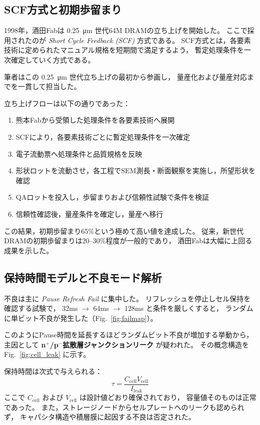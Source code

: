\documentclass[conference]{IEEEtran}
\let\meter\metre
\begin{document}
\subsection{SCF方式と初期歩留まり}
1998年，酒田Fabは \SI{0.25}{\micro\meter} 世代64M DRAMの立ち上げを開始した。
ここで採用されたのが \emph{Short Cycle Feedback (SCF)} 方式である。
SCF方式とは，各要素技術に定められたマニュアル規格を短期間で満足するよう，
暫定処理条件を一次確定していく方式である。

筆者はこの \SI{0.25}{\micro\meter} 世代立ち上げの最初から参画し，
量産化および量産対応までを一貫して担当した。

立ち上げフローは以下の通りであった：
\begin{enumerate}
  \item 熊本Fabから受領した処理条件を各要素技術へ展開
  \item SCFにより，各要素技術ごとに暫定処理条件を一次確定
  \item 電子流動票へ処理条件と品質規格を反映
  \item 形状ロットを流動させ，各工程でSEM測長・断面観察を実施し，所望形状を確認
  \item QAロットを投入し，歩留まりおよび信頼性試験で条件を検証
  \item 信頼性確認後，量産条件を確定し，量産へ移行
\end{enumerate}

この結果，初期歩留まり65\%という極めて高い値を達成した。
従来，新世代DRAMの初期歩留まりは20--30\%程度が一般的であり，
酒田Fabは大幅に上回る成果を示した。

\subsection{保持時間モデルと不良モード解析}
不良は主に \emph{Pause Refresh Fail} に集中した。  
リフレッシュを停止しセル保持を確認する試験で，
32ms $\rightarrow$ 64ms $\rightarrow$ 128ms と条件を厳しくすると，
ランダムに単ビット不良が発生した（Fig.~\ref{fig:failmap}）。  

このようにPause時間を延長するほどランダムビット不良が増加する挙動から，
主因として \textbf{n$^+$/p$^-$拡散層ジャンクションリーク} が疑われた。  
その概念構造を Fig.~\ref{fig:cell_leak} に示す。  

保持時間は次式で与えられる：
\[
\tau = \frac{C_{\mathrm{cell}} V_{\mathrm{cell}}}{I_{\mathrm{leak}}}
\]
ここで $C_{\mathrm{cell}}$ および $V_{\mathrm{cell}}$ は設計値どおり確保されており，
容量値そのものは正常であった。  
また，ストレージノードからセルプレートへのリークも認められず，
キャパシタ構造や積層膜に起因する不良は否定された。  
\end{document}

